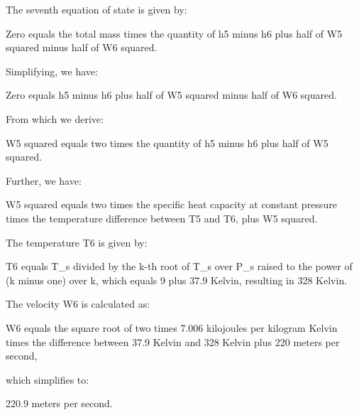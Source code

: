 The seventh equation of state is given by:

Zero equals the total mass times the quantity of h5 minus h6 plus half of W5 squared minus half of W6 squared.

Simplifying, we have:

Zero equals h5 minus h6 plus half of W5 squared minus half of W6 squared.

From which we derive:

W5 squared equals two times the quantity of h5 minus h6 plus half of W5 squared.

Further, we have:

W5 squared equals two times the specific heat capacity at constant pressure times the temperature difference between T5 and T6, plus W5 squared.

The temperature T6 is given by:

T6 equals T_s divided by the k-th root of T_s over P_s raised to the power of (k minus one) over k, which equals 9 plus 37.9 Kelvin, resulting in 328 Kelvin.

The velocity W6 is calculated as:

W6 equals the square root of two times 7.006 kilojoules per kilogram Kelvin times the difference between 37.9 Kelvin and 328 Kelvin plus 220 meters per second,

which simplifies to:

220.9 meters per second.
